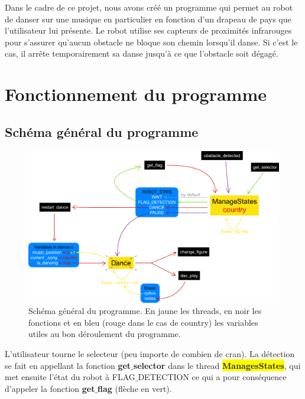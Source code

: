 \documentclass{article}
\begin{document}
    Dans le cadre de ce projet, nous avons créé un programme qui permet au robot de danser sur une musique en particulier en fonction d'un drapeau de pays que l'utilisateur lui présente.
    Le robot utilise ses capteurs de proximités infrarouges pour s'assurer qu'aucun obstacle ne bloque son chemin lorsqu'il danse. 
    Si c'est le cas, il arrête temporairement sa danse jusqu'à ce que l'obstacle soit dégagé.

    \section{Fonctionnement du programme}
    
    \subsection{Schéma général du programme}
    \begin{figure}[!ht]
        \includegraphics[scale=0.7]{images/code-structure.pdf}
        \caption{Schéma général du programme. En jaune les threads, en noir les fonctions et en bleu (rouge dans le cas de country) les variables utiles au bon déroulement du programme.}
        \label{fig:structure} %
    \end{figure}

    L'utilisateur tourne le selecteur (peu importe de combien de cran). 
    La détection se fait en appellant la fonction \textbf{get$\_$selector} dans le thread \colorbox{yellow}{\textbf{ManagesStates}}, qui met ensuite l'état du robot à \textcolor{bleu}{FLAG$\_$DETECTION} ce qui a pour conséquence d'appeler la fonction \textbf{get$\_$flag} (\textcolor{vert}{flèche en vert}). \\ \par
    
\end{document}
